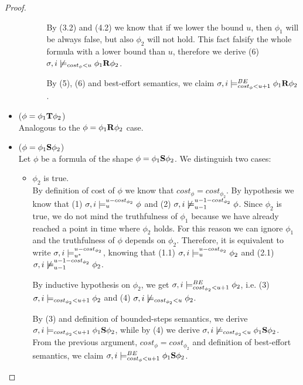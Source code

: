 \begin{theorem}
\begin{proof}
\begin{itemize}
\begin{itemize}
\begin{itemize}
            By (3.2) and (4.2) we know that if we lower the bound $u$, then $\phi_1$ will be always false, but also $\phi_2$ will not hold.
            This fact falsify the whole formula with a lower bound than $u$, therefore we derive 
            (6) $\sigma,i \not\models_{cost_\phi < u} \phi_1 \mathbf{R} \phi_2$.
            
            By (5), (6) and best-effort semantics, we claim $\sigma,i \models_{cost_\phi < u + 1}^{BE} \phi_1 \mathbf{R} \phi_2$.
            
        \end{itemize}
    \end{itemize}

    \item ($\phi = \phi_1 \mathbf{T} \phi_2$) \\
    Analogous to the $\phi = \phi_1 \mathbf{R} \phi_2$ case.

    \item ($\phi = \phi_1 \mathbf{S} \phi_2$) \\
    Let $\phi$ be a formula of the shape $\phi = \phi_1 \mathbf{S} \phi_2$.
    We distinguish two cases:
    \begin{itemize}
        \item $\phi_2$ is true. \\
        By definition of cost of $\phi$ we know that $cost_\phi = cost_{\phi_2}$.
        By hypothesis we know that 
        (1) $\sigma, i \models_{u}^{u-cost_{\phi_2}} \phi$ and (2) $\sigma, i \not\models_{u-1}^{u-1-cost_{\phi_2}} \phi$.
        Since $\phi_2$ is true, we do not mind the truthfulness of $\phi_1$ because we have already reached a point in time where $\phi_2$ holds.
        For this reason we can ignore $\phi_1$ and the truthfulness of $\phi$ depends on $\phi_2$.
        Therefore, it is equivalent to write $\sigma,i \models_{{u}^*}^{u-cost_{\phi_2}}$, knowing that 
        (1.1) $\sigma,i \models_{u}^{u-cost_{\phi_2}} \phi_2$ and 
        (2.1) $\sigma,i \not\models_{u-1}^{u-1-cost_{\phi_2}} \phi_2$.
        
        By inductive hypothesis on $\phi_2$, we get $\sigma,i \models_{cost_{\phi_2} < u + 1}^{BE} \phi_2$, i.e. 
        (3) $\sigma,i \models_{cost_{\phi_2} < u + 1} \phi_2$ and 
        (4) $\sigma,i \not\models_{cost_{\phi_2} < u} \phi_2$.

        By (3) and definition of bounded-steps semantics, we derive $\sigma,i \models_{cost_{\phi_2} < u + 1} \phi_1 \mathbf{S} \phi_2$, while by (4) we derive $\sigma,i \not\models_{cost_{\phi_2} < u} \phi_1 \mathbf{S} \phi_2$.
        From the previous argument, $cost_\phi = cost_{\phi_2}$ and definition of best-effort semantics, we claim $\sigma,i \models_{cost_\phi < u + 1}^{BE} \phi_1 \mathbf{S} \phi_2$.


\end{itemize}
\end{itemize}
\end{proof}
\end{theorem}
